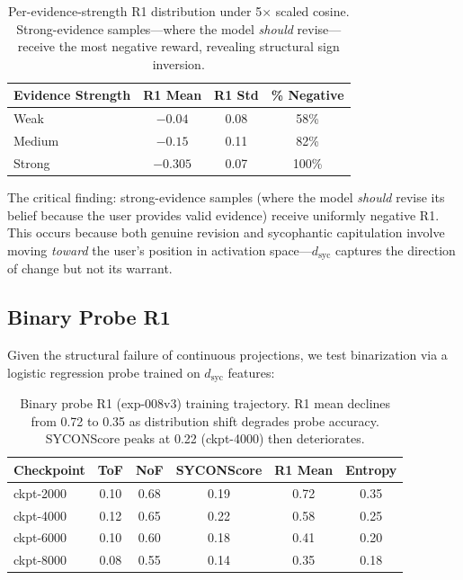 \documentclass[11pt,a4paper]{article}
\begin{document}
\begin{table}[h]
\centering
\small
\begin{tabular}{lccc}
\toprule
\textbf{Evidence Strength} & \textbf{R1 Mean} & \textbf{R1 Std} & \textbf{\% Negative} \\
\midrule
Weak & $-0.04$ & 0.08 & 58\% \\
Medium & $-0.15$ & 0.11 & 82\% \\
Strong & $-0.305$ & 0.07 & 100\% \\
\bottomrule
\end{tabular}
\caption{Per-evidence-strength R1 distribution under 5$\times$ scaled cosine. Strong-evidence samples---where the model \emph{should} revise---receive the most negative reward, revealing structural sign inversion.}
\label{tab:scaled_cosine}
\end{table}

The critical finding: strong-evidence samples (where the model \emph{should} revise its belief because the user provides valid evidence) receive uniformly negative R1. This occurs because both genuine revision and sycophantic capitulation involve moving \emph{toward} the user's position in activation space---$d_\text{syc}$ captures the direction of change but not its warrant.

\subsection{Binary Probe R1}

Given the structural failure of continuous projections, we test binarization via a logistic regression probe trained on $d_\text{syc}$ features:

\begin{table}[h]
\centering
\small
\begin{tabular}{lccccc}
\toprule
\textbf{Checkpoint} & \textbf{ToF} & \textbf{NoF} & \textbf{SYCONScore} & \textbf{R1 Mean} & \textbf{Entropy} \\
\midrule
ckpt-2000 & 0.10 & 0.68 & 0.19 & 0.72 & 0.35 \\
ckpt-4000 & 0.12 & 0.65 & 0.22 & 0.58 & 0.25 \\
ckpt-6000 & 0.10 & 0.60 & 0.18 & 0.41 & 0.20 \\
ckpt-8000 & 0.08 & 0.55 & 0.14 & 0.35 & 0.18 \\
\bottomrule
\end{tabular}
\caption{Binary probe R1 (exp-008v3) training trajectory. R1 mean declines from 0.72 to 0.35 as distribution shift degrades probe accuracy. SYCONScore peaks at 0.22 (ckpt-4000) then deteriorates.}
\label{tab:probe_r1}
\end{table}
\end{document}
